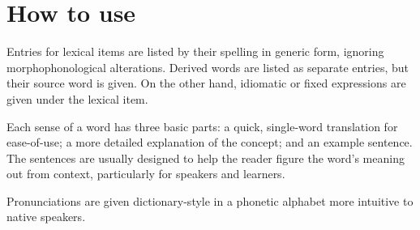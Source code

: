 \section*{How to use}
Entries for lexical items are listed by their spelling in generic form, ignoring morphophonological alterations. Derived words are listed as separate entries, but their source word is given. On the other hand, idiomatic or fixed expressions are given under the lexical item.

Each sense of a word has three basic parts: a quick, single-word translation for ease-of-use; a more detailed explanation of the concept; and an example sentence. The sentences are usually designed to help the reader figure the word's meaning out from context, particularly for \langname{} speakers and learners.

Pronunciations are given dictionary-style in a phonetic alphabet more intuitive to native \langname{} speakers.

